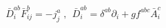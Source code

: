 \begin{equation}
\bar{D}^{ab}_{i} \bar{F}^{b}_{ij} = -j_j^a \;, \ \
\bar{D}^{ab}_{i} = \delta^{ab} \partial_{i} + gf^{abc} \bar{A}^{c}_{i}
\end{equation}

